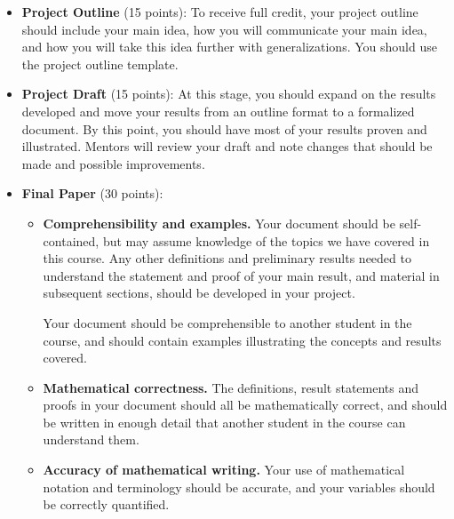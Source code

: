 \documentclass{article}
\begin{document}
\begin{itemize}
    \item \textbf{Project Outline} (15 points): To receive full credit, your project outline should include your main idea, how you will communicate your main idea, and how you will take this idea further with generalizations. You should use the project outline template.
    \item \textbf{Project Draft} (15 points): At this stage, you should expand on the results developed and move your results from an outline format to a formalized document. By this point, you should have most of your results proven and illustrated. Mentors will review your draft and note changes that should be made and possible improvements.
    \item \textbf{Final Paper} (30 points):
    \begin{itemize}
        \item \textbf{Comprehensibility and examples.}
        Your document should be self-contained, but may assume knowledge of the topics we have covered in this course. Any other definitions and preliminary results needed to understand the statement and proof of your main result, and material in subsequent sections, should be developed in your project.
        
        Your document should be comprehensible to another student in the course, and should contain examples illustrating the concepts and results covered.
        \item \textbf{Mathematical correctness.} The definitions, result statements and proofs in your document should all be mathematically correct, and should be written in enough detail that another student in the course can understand them.
        \item \textbf{Accuracy of mathematical writing.} Your use of mathematical notation and terminology should be accurate, and your variables should be correctly quantified.
    

\end{itemize}
\end{itemize}
\end{document}
